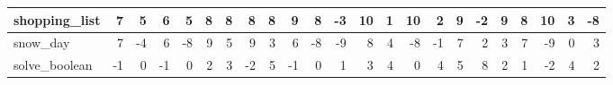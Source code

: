 \begin{table}[!h]
{\begin{tabular}{|p{2.9cm}|rr|rr|rr|rr|rr|r||rr|rr|rr|rr|rr|r|}
			shopping\_list         & \cellcolor[HTML]{97C384}7            & {\cellcolor[HTML]{B5D4A7}5}            & \cellcolor[HTML]{A6CB96}6            & {\cellcolor[HTML]{B5D4A7}5}            & \cellcolor[HTML]{88BA73}8            & {\cellcolor[HTML]{88BA73}8}            & \cellcolor[HTML]{88BA73}8            & {\cellcolor[HTML]{88BA73}8}            & \cellcolor[HTML]{79B161}9            & {\cellcolor[HTML]{88BA73}8}            & \cellcolor[HTML]{FFE0B2}-3            & \cellcolor[HTML]{6AA84F}10           & {\cellcolor[HTML]{F1F7EE}1}            & \cellcolor[HTML]{6AA84F}10           & {\cellcolor[HTML]{E2EEDC}2}            & \cellcolor[HTML]{79B161}9            & {\cellcolor[HTML]{FAE4E3}-2}           & \cellcolor[HTML]{79B161}9            & {\cellcolor[HTML]{88BA73}8}            & \cellcolor[HTML]{6AA84F}10           & {\cellcolor[HTML]{D3E5CB}3}            & \cellcolor[HTML]{ED9718}-8            \\ \hline
			snow\_day              & \cellcolor[HTML]{97C384}7            & {\cellcolor[HTML]{F5CAC7}-4}           & \cellcolor[HTML]{A6CB96}6            & {\cellcolor[HTML]{EB968F}-8}           & \cellcolor[HTML]{79B161}9            & {\cellcolor[HTML]{B5D4A7}5}            & \cellcolor[HTML]{79B161}9            & {\cellcolor[HTML]{D3E5CB}3}            & \cellcolor[HTML]{A6CB96}6            & {\cellcolor[HTML]{EB968F}-8}           & \cellcolor[HTML]{FFA319}-9            & \cellcolor[HTML]{88BA73}8            & {\cellcolor[HTML]{C4DDB9}4}            & \cellcolor[HTML]{EB968F}-8           & {\cellcolor[HTML]{FCF1F1}-1}           & \cellcolor[HTML]{97C384}7            & {\cellcolor[HTML]{E2EEDC}2}            & \cellcolor[HTML]{D3E5CB}3            & {\cellcolor[HTML]{97C384}7}            & \cellcolor[HTML]{E88981}-9           & {\cellcolor[HTML]{FFFFFF}0}            & \cellcolor[HTML]{858C9E}3             \\ \hline
			solve\_boolean         & \cellcolor[HTML]{FCF1F1}-1           & {\cellcolor[HTML]{FFFFFF}0}            & \cellcolor[HTML]{FCF1F1}-1           & {\cellcolor[HTML]{FFFFFF}0}            & \cellcolor[HTML]{E2EEDC}2            & {\cellcolor[HTML]{D3E5CB}3}            & \cellcolor[HTML]{FAE4E3}-2           & {\cellcolor[HTML]{B5D4A7}5}            & \cellcolor[HTML]{FCF1F1}-1           & {\cellcolor[HTML]{FFFFFF}0}            & \cellcolor[HTML]{EDF3FE}1             & \cellcolor[HTML]{D3E5CB}3            & {\cellcolor[HTML]{C4DDB9}4}            & \cellcolor[HTML]{FFFFFF}0            & {\cellcolor[HTML]{C4DDB9}4}            & \cellcolor[HTML]{B5D4A7}5            & {\cellcolor[HTML]{88BA73}8}            & \cellcolor[HTML]{E2EEDC}2            & {\cellcolor[HTML]{F1F7EE}1}            & \cellcolor[HTML]{FAE4E3}-2           & {\cellcolor[HTML]{C4DDB9}4}            & \cellcolor[HTML]{8F8E92}2             \\ \hline

\end{tabular}}
\end{table}
